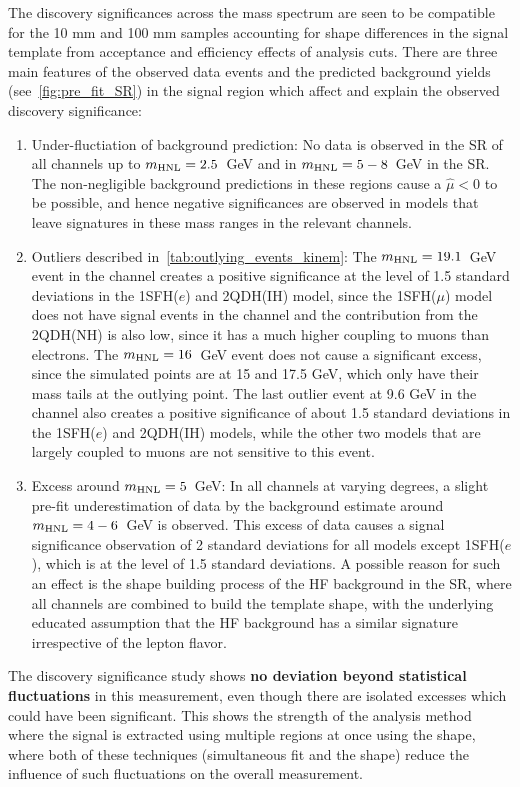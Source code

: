 The discovery significances across the mass spectrum are seen to be compatible for the 10 mm and 100 mm samples accounting for shape differences in the signal template from acceptance and efficiency effects of analysis cuts. There are three main features of the observed data events and the predicted background yields (see~\cref{fig:pre_fit_SR}) in the signal region which affect and explain the observed discovery significance:
\begin{enumerate}
    \item Under-fluctiation of background prediction: No data is observed in the SR of all channels up to $m_{\mathrm{HNL}}=2.5$~GeV and in $m_{\mathrm{HNL}}=5-8$~GeV in the \uue SR. The non-negligible background predictions in these regions cause a $\hat{\mu}<0$ to be possible, and hence negative significances are observed in models that leave signatures in these mass ranges in the relevant channels.
    \item Outliers described in~\cref{tab:outlying_events_kinem}: The $m_{\mathrm{HNL}}=19.1$~GeV event in the \euu channel creates a positive significance at the level of 1.5 standard deviations in the 1SFH($e$) and 2QDH(IH) model, since the 1SFH($\mu$) model does not have signal events in the \euu channel and the contribution from the 2QDH(NH) is also low, since it has a much higher coupling to muons than electrons. The $m_{\mathrm{HNL}}=16$~GeV event does not cause a significant excess, since the simulated points are at 15 and 17.5 GeV, which only have their mass tails at the outlying point. The last outlier event at 9.6 GeV in the \eeu channel also creates a positive significance of about 1.5 standard deviations in the 1SFH($e$) and 2QDH(IH) models, while the other two models that are largely coupled to muons are not sensitive to this event.
    \item Excess around $m_{\mathrm{HNL}}=5$~GeV: In all channels at varying degrees, a slight pre-fit underestimation of data by the background estimate around $m_{\mathrm{HNL}}=4-6$~GeV is observed. This excess of data causes a signal significance observation of 2 standard deviations for all models except 1SFH($e$), which is at the level of 1.5 standard deviations. A possible reason for such an effect is the shape building process of the HF background in the SR, where all channels are combined to build the template shape, with the underlying educated assumption that the HF background has a similar signature irrespective of the lepton flavor.
\end{enumerate}

The discovery significance study shows \textbf{no deviation beyond statistical fluctuations} in this measurement, even though there are isolated excesses which could have been significant. This shows the strength of the analysis method where the signal is extracted using multiple regions at once using the \mhnl shape, where both of these techniques (simultaneous fit and the \mhnl shape) reduce the influence of such fluctuations on the overall measurement.

